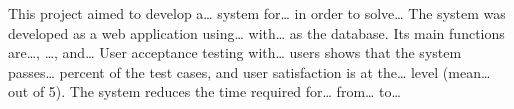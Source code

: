 %
This project aimed to develop a\ldots{} system for\ldots{} in order to solve\ldots{}
The system was developed as a web application using\ldots{} with\ldots{} as the database.
Its main functions are\ldots, \ldots, and\ldots{}
User acceptance testing with\ldots{} users shows that the system passes\ldots{} percent
of the test cases, and user satisfaction is at the\ldots{} level (mean\ldots{} out of 5).
The system reduces the time required for\ldots{} from\ldots{} to\ldots{}
